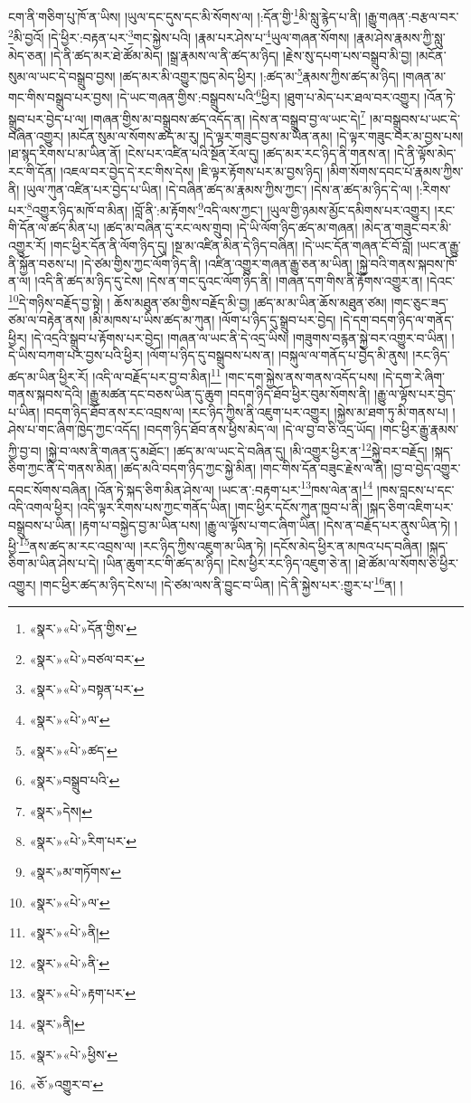 ངག་ནི་གཅིག་པུ་ཁོ་ན་ཡིས། །ཡུལ་དང་དུས་དང་མི་སོགས་ལ། །:དོན་གྱི་\footnote{«སྣར་»«པེ་»དོན་གྱིས་}མི་སླུ་རྙེད་པ་ནི། །རྒྱུ་གཞན་:བརྩལ་བར་\footnote{«སྣར་»«པེ་»བཙལ་བར་}མི་བྱའོ། །དེ་ཕྱིར་:བརྟན་པར་\footnote{«སྣར་»«པེ་»བསྟན་པར་}གང་སྐྱེས་པའི། །རྣམ་པར་ཤེས་པ་\footnote{«སྣར་»«པེ་»ལ་}ཡུལ་གཞན་སོགས། །རྣམ་ཤེས་རྣམས་ཀྱི་སླུ་མེད་ཅན། །དེ་ནི་ཚད་མར་ཐེ་ཚོམ་མེད། །སྒྲ་རྣམས་ལ་ནི་ཚད་མ་ཉིད། །རྗེས་སུ་དཔག་པས་བསྒྲུབ་མི་བྱ། །མངོན་སུམ་ལ་ཡང་དེ་བསྒྲུབ་བྱས། །ཚད་མར་མི་འགྱུར་ཁྱད་མེད་ཕྱིར། །:ཚད་མ་\footnote{«སྣར་»«པེ་»ཚད་}རྣམས་ཀྱིས་ཚད་མ་ཉིད། །གཞན་མ་གང་གིས་བསྒྲུབ་པར་བྱས། །དེ་ཡང་གཞན་གྱིས་:བསྒྲུབས་པའི་\footnote{«སྣར་»བསྒྲུབ་པའི་}ཕྱིར། །ཐུག་པ་མེད་པར་ཐལ་བར་འགྱུར། །འོན་ཏེ་སྒྲུབ་པར་བྱེད་པ་ལ། །གཞན་གྱིས་མ་བསྒྲུབས་ཚད་འདོད་ན། །དེས་ན་བསྒྲུབ་བྱ་ལ་ཡང་དེ།\footnote{«སྣར་»དེས།} །མ་བསྒྲུབས་པ་ཡང་དེ་བཞིན་འགྱུར། །མངོན་སུམ་ལ་སོགས་ཚད་མ་རུ། །དེ་ལྟར་གཟུང་བྱས་མ་ཡིན་ནམ། །དེ་ལྟར་གཟུང་བར་མ་བྱས་པས། །ཐ་སྙད་རིགས་པ་མ་ཡིན་ནོ། །ངེས་པར་འཛིན་པའི་སྔོན་རོལ་དུ། །ཚད་མར་རང་ཉིད་ནི་གནས་ན། །དེ་ནི་ལྟོས་མེད་རང་གི་དོན། །འཇལ་བར་བྱེད་དེ་རང་གིས་དེས། །ཇི་ལྟར་རྟོགས་པར་མ་བྱས་ཉིད། །མིག་སོགས་དབང་པོ་རྣམས་ཀྱིས་ནི། །ཡུལ་ཀུན་འཛིན་པར་བྱེད་པ་ཡིན། །དེ་བཞིན་ཚད་མ་རྣམས་ཀྱིས་ཀྱང་། །དེས་ན་ཚད་མ་ཉིད་དེ་ལ། །:རིགས་པར་\footnote{«སྣར་»«པེ་»རིག་པར་}འགྱུར་ཉིད་མཁོ་བ་མིན། །བློ་ནི་:མ་རྟོགས་\footnote{«སྣར་»མ་གཏོགས་}འདི་ལས་ཀྱང་། །ཡུལ་གྱི་ཉམས་མྱོང་དམིགས་པར་འགྱུར། །རང་གི་དོན་ལ་ཚད་མིན་པ། །ཚད་མ་བཞིན་དུ་རང་ལས་གྲུབ། །དེ་ཡི་ལོག་ཉིད་ཚད་མ་གཞན། །མེད་ན་གཟུང་བར་མི་འགྱུར་རོ། །གང་ཕྱིར་དོན་ནི་ལོག་ཉིད་དུ། །སྔ་མ་འཛིན་མིན་དེ་ཉིད་བཞིན། །དེ་ཡང་དོན་གཞན་ངོ་བོ་བློ། །ཡང་ན་རྒྱུ་ནི་སྐྱོན་བཅས་པ། །དེ་ཙམ་གྱིས་ཀྱང་ལོག་ཉིད་ནི། །འཛིན་འགྱུར་གཞན་རྒྱུ་ཅན་མ་ཡིན། །སྐྱེ་བའི་གནས་སྐབས་ཁོ་ན་ལ། །འདི་ནི་ཚད་མ་ཉིད་དུ་ངེས། །དེས་ན་གང་དུའང་ལོག་ཉིད་ནི། །གཞན་དག་གིས་ནི་རྟོགས་འགྱུར་ན། །དེའང་\footnote{«སྣར་»«པེ་»ལ་}དེ་གཉིས་བརྗོད་བྱ་སྟེ། །
ཆོས་མཐུན་ཙམ་གྱིས་བརྗོད་མི་བྱ། །ཚད་མ་མ་ཡིན་ཆོས་མཐུན་ཙམ། །གང་ཅུང་ཟད་ཙམ་ལ་བརྟེན་ནས། །མི་མཁས་པ་ཡིས་ཚད་མ་ཀུན། །ལོག་པ་ཉིད་དུ་སྒྲུབ་པར་བྱེད། །དེ་དག་བདག་ཉིད་ལ་གནོད་ཕྱིར། །དེ་འདྲའི་སྒྲུབ་པ་རྟོགས་པར་བྱེད། །གཞན་ལ་ཡང་ནི་དེ་འདྲ་ཡིས། །གཟུགས་བརྙན་སྐྱེ་བར་འགྱུར་བ་ཡིན། །དེ་ཡིས་བཀག་པར་བྱས་པའི་ཕྱིར། །ལོག་པ་ཉིད་དུ་བསྒྲུབས་པས་ན། །བསྐུལ་ལ་གནོད་པ་བྱེད་མི་ནུས། །རང་ཉིད་ཚད་མ་ཡིན་ཕྱིར་རོ། །འདི་ལ་བརྗོད་པར་བྱ་བ་མིན།\footnote{«སྣར་»«པེ་»ནི།} །གང་དག་སྐྱེས་ནས་གནས་འདོད་པས། །དེ་དག་རེ་ཞིག་གནས་སྐབས་དེའི། །རྒྱུ་མཚན་དང་བཅས་ཡིན་དུ་ཆུག །བདག་ཉིད་ཐོབ་ཕྱིར་བུམ་སོགས་ནི། །རྒྱུ་ལ་ལྟོས་པར་བྱེད་པ་ཡིན། །བདག་ཉིད་ཐོབ་ནས་རང་འབྲས་ལ། །རང་ཉིད་ཀྱིས་ནི་འཇུག་པར་འགྱུར། །སྐྱེས་མ་ཐག་ཏུ་མི་གནས་པ། །ཤེས་པ་གང་ཞིག་ཁྱེད་ཀྱང་འདོད། །བདག་ཉིད་ཐོབ་ནས་ཕྱིས་མེད་ལ། །དེ་ལ་བྱ་བ་ཅི་འདྲ་ཡོད། །གང་ཕྱིར་རྒྱུ་རྣམས་ཀྱི་བྱ་བ། །སྐྱེ་བ་ལས་ནི་གཞན་དུ་མཐོང་། །ཚད་མ་ལ་ཡང་དེ་བཞིན་དུ། །མི་འགྱུར་ཕྱིར་ན་\footnote{«སྣར་»«པེ་»ནི་}སྐྱེ་བར་བརྗོད། །སྐད་ཅིག་ཀྱང་ནི་དེ་གནས་མིན། །ཚད་མའི་བདག་ཉིད་ཀྱང་སྐྱེ་མིན། །གང་གིས་དོན་བཟུང་རྗེས་ལ་ནི། །བྱ་བ་བྱེད་འགྱུར་དབང་སོགས་བཞིན། །འོན་ཏེ་སྐད་ཅིག་མིན་ཤེས་ལ། །ཡང་ན་:བརྟག་པར་\footnote{«སྣར་»«པེ་»རྟག་པར་}ཁས་ལེན་ན།\footnote{«སྣར་»ནི།} །ཁས་བླངས་པ་དང་འདི་འགལ་ཕྱིར། །འདི་ལྟར་རིགས་པས་ཀྱང་གནོད་ཡིན། །གང་ཕྱིར་དངོས་ཀུན་ཁྱབ་པ་ནི། །སྐད་ཅིག་འཇིག་པར་བསྒྲུབས་པ་ཡིན། །རྟག་པ་བསྐྱེད་བྱ་མ་ཡིན་པས། །རྒྱུ་ལ་ལྟོས་པ་གང་ཞིག་ཡིན། །དེས་ན་བརྗོད་པར་ནུས་ཡིན་ཏེ། །ཕྱི་\footnote{«སྣར་»«པེ་»ཕྱིས་}ནས་ཚད་མ་རང་འབྲས་ལ། །རང་ཉིད་ཀྱིས་འཇུག་མ་ཡིན་ཏེ། །དངོས་མེད་ཕྱིར་ན་མཁའ་པད་བཞིན། །སྐད་ཅིག་མ་ཡིན་ཤེས་པ་དེ། །ཡིན་ཆུག་རང་གི་ཚད་མ་ཉིད། །ངེས་ཕྱིར་རང་ཉིད་འཇུག་ཅེ་ན། །ཐེ་ཚོམ་ལ་སོགས་ཅི་ཕྱིར་འགྱུར། །གང་ཕྱིར་ཚད་མ་ཉིད་ངེས་པ། །དེ་ཙམ་ལས་ནི་བྱུང་བ་ཡིན། །དེ་ནི་སྐྱེས་པར་:གྱུར་པ་\footnote{«ཅོ་»འགྱུར་བ་}ན། །
